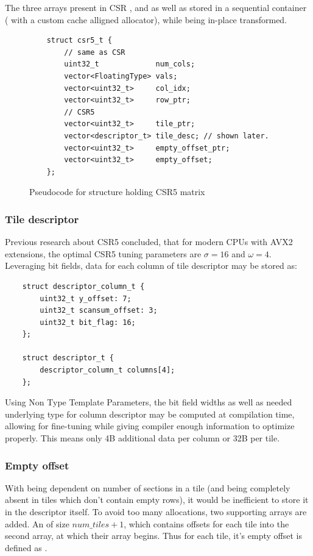 \documentclass[thesis=M,english]{FITthesis}[2019/12/23]
\begin{document}
The three arrays present in CSR ,  and  as well as 
stored in a sequential container ( with a custom cache alligned allocator),
while being in-place transformed.

\begin{figure}[!h]
    \begin{verbatim}
    struct csr5_t {
        // same as CSR
        uint32_t             num_cols;
        vector<FloatingType> vals;
        vector<uint32_t>     col_idx;
        vector<uint32_t>     row_ptr;
        // CSR5
        vector<uint32_t>     tile_ptr;
        vector<descriptor_t> tile_desc; // shown later.
        vector<uint32_t>     empty_offset_ptr;
        vector<uint32_t>     empty_offset;
    };
    \end{verbatim}
    \caption{Pseudocode for structure holding CSR5 matrix}
\end{figure}


\subsubsection{Tile descriptor}

Previous research about CSR5 \cite{liu2015csr5} concluded, that for modern CPUs with AVX2 extensions, the optimal CSR5 tuning parameters
are $\sigma = 16$ and $\omega = 4$. Leveraging bit fields, data for each column of tile descriptor may be
stored as:

\begin{verbatim}
    struct descriptor_column_t {
        uint32_t y_offset: 7;
        uint32_t scansum_offset: 3;
        uint32_t bit_flag: 16;
    };

    struct descriptor_t {
        descriptor_column_t columns[4];
    };
\end{verbatim}

Using Non Type Template Parameters, the bit field widths as well as needed underlying type for column
descriptor may be computed at compilation time, allowing for fine-tuning while giving compiler enough
information to optimize properly. This means only 4B additional data per column or 32B per tile.

\subsubsection{Empty offset}

With  being dependent on number of sections in a tile (and being completely absent
in tiles which don't contain empty rows), it would be inefficient to
store it in the descriptor itself. To avoid too many allocations, two supporting arrays are added.
An  of size $num\_tiles + 1$, which contains offsets for each tile into the
second array,  at which their  array begins.
Thus for each tile, it's empty offset is defined as .
\end{document}

